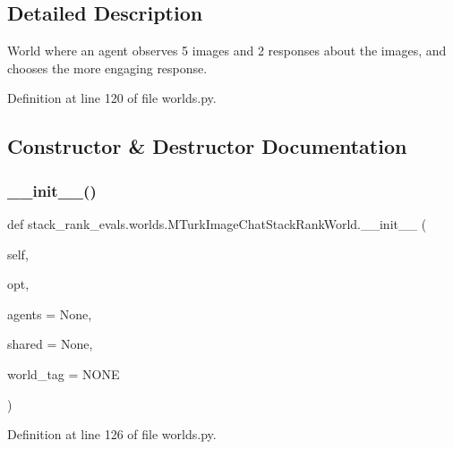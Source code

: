 \subsection{Detailed Description}
\begin{DoxyVerb}World where an agent observes 5 images and 2 responses about the images, and chooses
the more engaging response.
\end{DoxyVerb}
 

Definition at line 120 of file worlds.\+py.



\subsection{Constructor \& Destructor Documentation}
\mbox{\label{classstack__rank__evals_1_1worlds_1_1MTurkImageChatStackRankWorld_aee5ebf396ed850b0121c2bfb3cb871d3}} 
\subsubsection{\texorpdfstring{\+\_\+\+\_\+init\+\_\+\+\_\+()}{\_\_init\_\_()}}
{\footnotesize\ttfamily def stack\+\_\+rank\+\_\+evals.\+worlds.\+M\+Turk\+Image\+Chat\+Stack\+Rank\+World.\+\_\+\+\_\+init\+\_\+\+\_\+ (\begin{DoxyParamCaption}\item[{}]{self,  }\item[{}]{opt,  }\item[{}]{agents = {\ttfamily None},  }\item[{}]{shared = {\ttfamily None},  }\item[{}]{world\+\_\+tag = {\ttfamily \textquotesingle{}NONE\textquotesingle{}} }\end{DoxyParamCaption})}



Definition at line 126 of file worlds.\+py.


